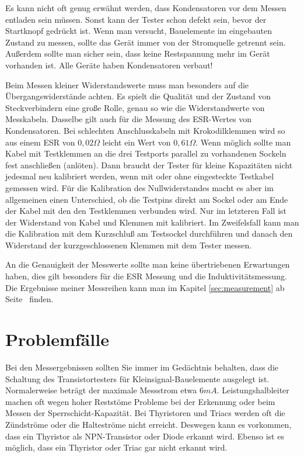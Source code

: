 Es kann nicht oft genug erwähnt werden, dass Kondensatoren vor dem Messen entladen sein müssen.
Sonst kann der Tester schon defekt sein, bevor der Startknopf gedrückt ist.
Wenn man versucht, Bauelemente im eingebauten Zustand zu messen, sollte das Gerät immer von
der Stromquelle getrennt sein. Außerdem sollte man sicher sein, dass keine Restspannung mehr
im Gerät vorhanden ist. Alle Geräte haben Kondensatoren verbaut!

Beim Messen kleiner Widerstandswerte muss man besonders auf die Übergangswiderstände achten.
Es spielt die Qualität und der Zustand von Steckverbindern eine große Rolle, genau so wie die
Widerstandwerte von Messkabeln. Dasselbe gilt auch für die Messung des ESR-Wertes von Kondensatoren.
Bei schlechten Anschlusskabeln mit Krokodilklemmen wird so aus einem ESR von \(0,02\Omega\) leicht
ein Wert von \(0,61\Omega\).
Wenn möglich sollte man Kabel mit Testklemmen an die drei Testports parallel zu vorhandenen Sockeln fest anschließen (anlöten).
Dann braucht der Tester für kleine Kapazitäten nicht jedesmal neu kalibriert werden, wenn mit oder ohne eingesteckte
Testkabel gemessen wird. Für die Kalibration des Nullwiderstandes macht es aber im allgemeinen einen Unterschied, 
ob die Testpins direkt am Sockel oder am Ende der Kabel mit den den Testklemmen verbunden wird. Nur im letzteren
Fall ist der Widerstand von Kabel und Klemmen mit kalibriert. Im Zweifelsfall kann man die Kalibration mit dem
Kurzschluß am Testsockel durchführen und danach den Widerstand der kurzgeschlossenen Klemmen mit dem Tester messen.

An die Genauigkeit der Messwerte sollte man keine übertriebenen Erwartungen haben, dies gilt besonders
für die ESR Messung und die Induktivitätsmessung.
Die Ergebnisse meiner Messreihen kann man im Kapitel \ref{sec:measurement} ab Seite~\pageref{sec:measurement} finden.



\section{Problemfälle}
Bei den Messergebnissen sollten Sie immer im Gedächtnis behalten, dass die Schaltung des Transistortesters für
Kleinsignal-Bauelemente ausgelegt ist. Normalerweise beträgt der maximale Messstrom etwa \(6mA\).
Leistungshalbleiter machen oft wegen hoher Reststöme Probleme bei der Erkennung oder beim Messen der
Sperrschicht-Kapazität.
Bei Thyristoren und Triacs werden oft die Zündströme oder die Halteströme nicht erreicht. Deswegen kann es
vorkommen, dass ein Thyristor als NPN-Transistor oder Diode erkannt wird. Ebenso ist es möglich, dass ein 
Thyristor oder Triac gar nicht erkannt wird.

